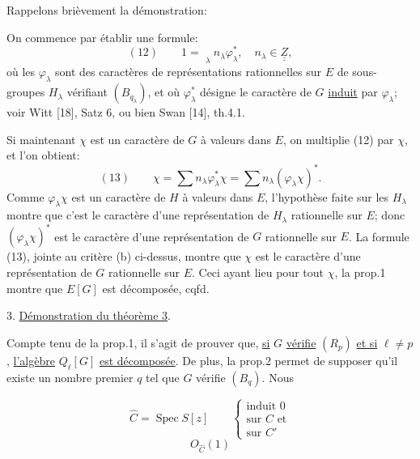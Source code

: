 Rappelons brièvement la démonstration:

On commence par établir une formule:
\[
(12)\qquad 1=\underset{\lambda}{\quad}n_\lambda\varphi^*_\lambda,
\quad n_\lambda\in\underline{\underline Z},
\]
où les $\varphi_\lambda$ sont des caractères de représentations rationnelles sur
$E$ de sous-groupes $H_\lambda$ vérifiant $(B_{q_\lambda})$, et où
$\varphi^*_\lambda$ désigne le caractère de $G$ \uline{induit} par
$\varphi_\lambda$; voir Witt [18], Satz 6, ou bien Swan [14], th.4.1.

Si maintenant $\chi$ est un caractère de $G$ à valeurs dans $E$, on multiplie
(12) par $\chi$, et l'on obtient:
\[
(13)\qquad \chi=\sum n_\lambda\varphi^*_\lambda\chi
=\sum n_\lambda(\varphi_\lambda\chi)^*.
\]
Comme $\varphi_\lambda\chi$ est un caractère de $H$ à valeurs dans $E$,
l'hypothèse faite sur les $H_\lambda$ montre que c'est le caractère d'une
représentation de $H_\lambda$ rationnelle sur $E$; donc
$(\varphi_\lambda\chi)^*$ est le caractère d'une représentation de $G$
rationnelle sur $E$. La formule (13), jointe au critère (b) ci-dessus, montre
que $\chi$ est le caractère d'une représentation de $G$ rationnelle sur $E$.
Ceci ayant lieu pour tout $\chi$, la prop.1 montre que $E[G]$ est décomposée, cqfd.

3. \uline{Démonstration du théorème 3}.

Compte tenu de la prop.1, il s'agit de prouver que, \uline{si} $G$ \uline{vérifie}
$(R_p)$ \uline{et si} $\ell\ne p$, \uline{l'algèbre} $Q_\ell[G]$
\uline{est décomposée}. De plus, la prop.2 permet de supposer qu'il existe un
nombre premier $q$ tel que $G$ vérifie $(B_q)$. Nous

\[
\hat C=\operatorname{Spec}S[z]\qquad
\left\{\begin{gathered}\text{induit }0\\\text{sur }C\text{ et}\\\text{sur }C'\end{gathered}\right.
\]
\[
O_{\hat C}(1)
\]



